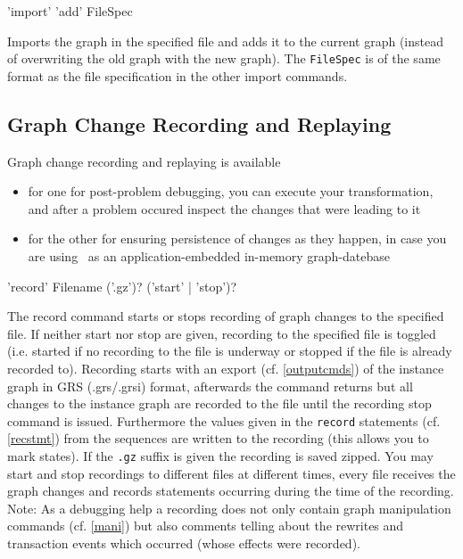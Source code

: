 \begin{rail}
  'import' 'add' FileSpec
\end{rail}
Imports the graph in the specified file and adds it to the current graph
(instead of overwriting the old graph with the new graph).
The \texttt{FileSpec} is of the same format as the file specification in the other import commands.

\subsection{Graph Change Recording and Replaying}
\label{recordnreplay}

Graph change recording and replaying is available 
\begin{itemize}
	\item for one for post-problem debugging, you can execute your transformation, and after a problem occured inspect the changes that were leading to it
	\item for the other for ensuring persistence of changes as they happen, in case you are using \GrG\ as an application-embedded in-memory graph-datebase
\end{itemize}

\begin{rail}
  'record' Filename ('.gz')? ('start' | 'stop')?
\end{rail}
The record command starts or stops recording of graph changes to the specified file. If neither start nor stop are given, recording to the specified file is toggled (i.e. started if no recording to the file is underway or stopped if the file is already recorded to).
Recording starts with an export (cf. \ref{outputcmds}) of the instance graph in GRS (.grs/.grsi) format, afterwards the command returns but all changes to the instance graph are recorded to the file until the recording stop command is issued.
Furthermore the values given in the \texttt{record} statements (cf. \ref{recstmt}) from the sequences are written to the recording (this allows you to mark states).
If the \texttt{.gz} suffix is given the recording is saved zipped.
You may start and stop recordings to different files at different times, every file receives the graph changes and records statements occurring during the time of the recording.
Note: As a debugging help a recording does not only contain graph manipulation commands (cf. \ref{mani}) but also comments telling about the rewrites and transaction events which occurred (whose effects were recorded).

